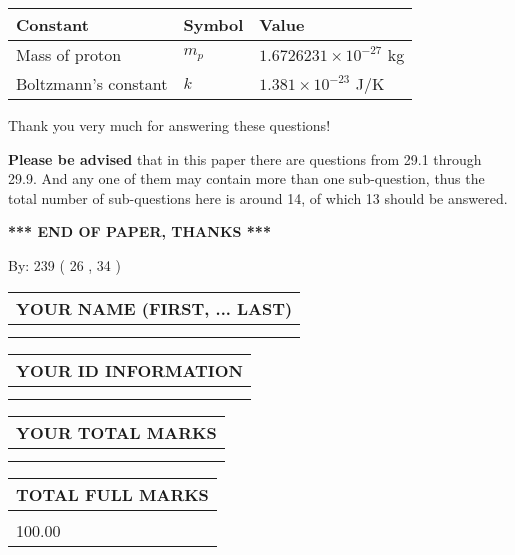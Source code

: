 \documentclass[12pt]{article}
\begin{document}
 
\noindent\begin{tabular}{|l|l|l|}
\hline
Constant & Symbol & Value \\
\hline
 
Mass of proton &
$m_p$ &
 $ 1.6726231 \times 10^{-27} $
kg \\
\hline
 
Boltzmann's constant &
$k$ &
 $ 1.381 \times 10^{-23} $
J/K \\
\hline
 
\end{tabular}
 
Thank you very much for answering these questions!
 
{\textbf{\large{Please be advised}}} that in this paper there are questions from
29.1 through
29.9.
And any one of them may contain more than one sub-question, thus the total number
of sub-questions here is around 14, of which
13 should be answered.
 
   
   
   
   
\vspace{1.0in} 
{\textbf{\large{ *** END OF PAPER, THANKS *** }}} 
   
   
\hspace{1.0in} By: 
         239 (          26 ,           34 )
   
   
   
   
\newpage 
\setcounter{page}{ 
    30001 } 
   
   
   
   
\noindent\begin{tabular}{|l|}
\hline
YOUR NAME (FIRST, ... LAST)  \\
\hline
 \\ 
 \\ 
\hline
\end{tabular}
\hspace{0.05in} \begin{tabular}{|l|}
\hline
 YOUR   ID   INFORMATION  \\
\hline
 \\ 
 \\ 
\hline
\end{tabular}
   
   
\vspace{0.2in}\noindent\begin{tabular}{|l|}
\hline
YOUR TOTAL MARKS  \\
\hline
 \\ 
 \\ 
\hline
\end{tabular}
\hspace{0.05in} \begin{tabular}{|l|}
\hline
TOTAL FULL MARKS  \\
\hline
 \\ 
100.00 \\
\hline
\end{tabular}
   
\end{document}
